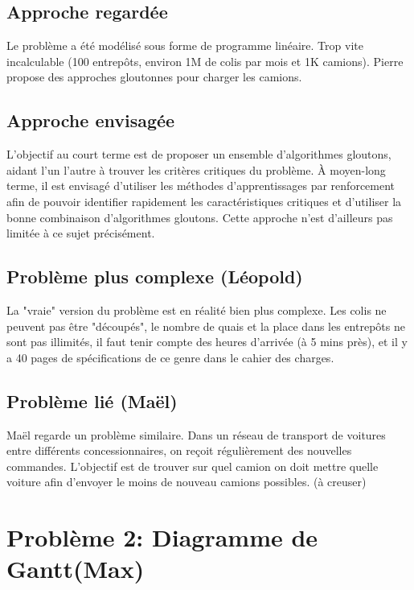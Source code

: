 \documentclass{article}
\begin{document}
\subsection{Approche regardée}
Le problème a été modélisé sous forme de programme linéaire. Trop vite incalculable (100 entrepôts, environ 1M de colis par mois et 1K camions).
Pierre propose des approches gloutonnes pour charger les camions.
\subsection{Approche envisagée}
L'objectif au court terme est de proposer un ensemble d'algorithmes gloutons, aidant l'un l'autre à trouver les critères critiques du problème.
À moyen-long terme, il est envisagé d'utiliser les méthodes d'apprentissages par renforcement afin de pouvoir identifier rapidement les caractéristiques critiques et d'utiliser la bonne combinaison d'algorithmes gloutons. Cette approche n'est d'ailleurs pas limitée à ce sujet précisément.

\subsection{Problème plus complexe (Léopold)}
La "vraie" version du problème est en réalité bien plus complexe. Les colis ne peuvent pas être "découpés", le nombre de quais et la place dans les entrepôts ne sont pas illimités, il faut tenir compte des heures d'arrivée (à 5 mins près), et il y a 40 pages de spécifications de ce genre dans le cahier des charges.

\subsection{Problème lié (Maël)}
Maël regarde un problème similaire. Dans un réseau de transport de voitures entre différents concessionnaires, on reçoit régulièrement des nouvelles commandes. L'objectif est de trouver sur quel camion on doit mettre quelle voiture afin d'envoyer le moins de nouveau camions possibles. (à creuser)

\section{Problème 2: Diagramme de Gantt(Max)}
\end{document}
